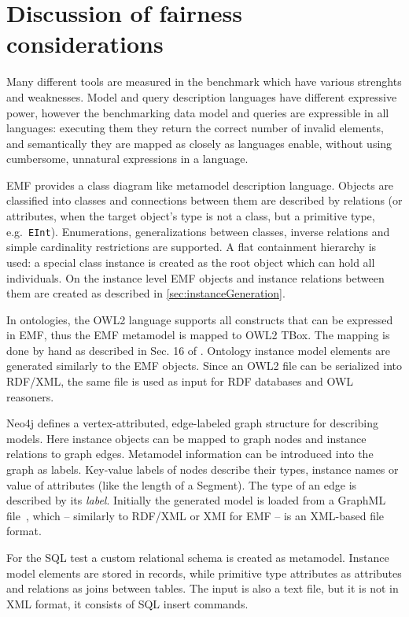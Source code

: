 \section{Discussion of fairness considerations}
Many different tools are measured in the benchmark which have various strenghts
and weaknesses. Model and query description languages have different expressive
power, however the benchmarking data model and queries are expressible in all
languages: executing them they return the correct number of invalid elements,
and semantically they are mapped as closely as languages enable, without using
cumbersome, unnatural expressions in a language.

EMF provides a class diagram like metamodel description language. Objects are
classified into classes and connections between them are described by relations
(or attributes, when the target object's type is not a class, but a primitive
type, e.g.\ \texttt{EInt}). Enumerations, generalizations between classes, inverse
relations and simple cardinality restrictions are supported. A flat containment
hierarchy is used: a special class instance is created as the root object which can
hold all individuals. On the instance level EMF objects and instance relations between them 
are created as described in \autoref{sec:instanceGeneration}.

In ontologies, the OWL2 language supports all constructs that can be expressed in
EMF, thus the EMF metamodel is mapped to OWL2 TBox. The mapping is done by hand as
described in Sec. 16 of \cite{OMG2009ODM}. Ontology instance model elements are
generated similarly to the EMF objects. Since an OWL2 file can be serialized
into RDF/XML, the same file is used as input for RDF databases and OWL
reasoners.

Neo4j defines a vertex-attributed, edge-labeled graph structure for describing
models. Here instance objects can be mapped to graph nodes and instance
relations to graph edges. Metamodel information can be introduced into the graph
as labels. Key-value labels of nodes describe their types, instance names or
value of attributes (like the length of a Segment). The type of an edge is described by its \emph{label}.
Initially the generated model is loaded from a GraphML file~\cite{GraphML},
which -- similarly to RDF/XML or XMI for EMF -- is an XML-based file format.

For the SQL test a custom relational schema is created as metamodel. Instance
model elements are stored in records, while primitive type attributes as
attributes and relations as joins between tables. The input is also a text
file, but it is not in XML format, it consists of SQL insert commands.

